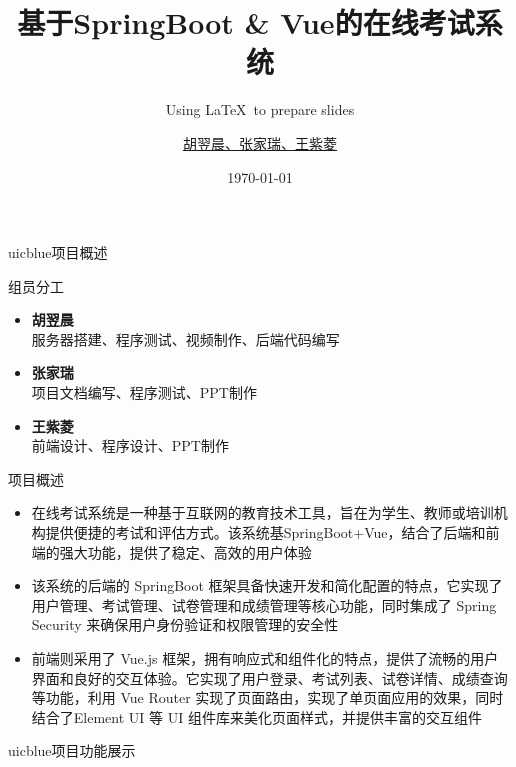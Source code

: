 \documentclass{beamer}
\title{基于SpringBoot \& Vue的在线考试系统}
\subtitle{Using \LaTeX\ to prepare slides}
\author{\href{mailto:umunee2@uic.edu}{胡翌晨、张家瑞、王紫菱}}
\date{\today}
\begin{document}
\maketitle
{} %


\begin{chapter}{uicblue}{项目概述}
\end{chapter}

\begin{frame}[fragile]{组员分工}
\begin{itemize}
    \item \textbf{胡翌晨}\\
    \qquad 服务器搭建、程序测试、视频制作、后端代码编写
    \item \textbf{张家瑞}\\
    \qquad 项目文档编写、程序测试、PPT制作
    \item \textbf{王紫菱}\\
    \qquad 前端设计、程序设计、PPT制作
\end{itemize}
\end{frame}


\begin{frame}[fragile]{项目概述}
\begin{itemize}
    \item 在线考试系统是一种基于互联网的教育技术工具，旨在为学生、教师或培训机构提供便捷的考试和评估方式。该系统基SpringBoot+Vue，结合了后端和前端的强大功能，提供了稳定、高效的用户体验
    \item 该系统的后端的 SpringBoot 框架具备快速开发和简化配置的特点，它实现了用户管理、考试管理、试卷管理和成绩管理等核心功能，同时集成了 Spring Security 来确保用户身份验证和权限管理的安全性
    \item 前端则采用了 Vue.js 框架，拥有响应式和组件化的特点，提供了流畅的用户界面和良好的交互体验。它实现了用户登录、考试列表、试卷详情、成绩查询等功能，利用 Vue Router 实现了页面路由，实现了单页面应用的效果，同时结合了Element UI 等 UI 组件库来美化页面样式，并提供丰富的交互组件
\end{itemize}
\end{frame}

\begin{chapter}{uicblue}{项目功能展示}
\end{chapter}
\end{document}
